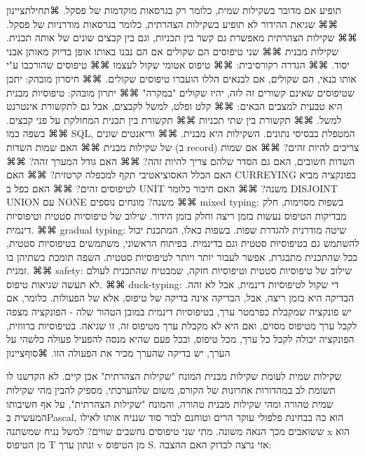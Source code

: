       תופיע אם מדובר בשקילות שמית, כלומר רק בגרסאות מוקדמות של פסקל.
      ⌘תחילת{ציינון}
      ⌘⌘ שגיאת ההידור לא תופיע בשקילות הצהרתית, כלומר בגרסאות מודרניות של פסקל.
      ⌘⌘ שקילות הצהרתית מאפשרת גם קשר בין תכניות, וגם בין קבצים שונים של אותה תכנית.
      שקילות מבנית
      ⌘⌘ שני טיפוסים הם שקולים אם הם נבנו באותו אופן בדיוק מאותן אבני יסוד.
      ⌘⌘ הגדרה רקורסיבית:
      ⌘⌘ טיפוס אטומי שקול לעצמו
      ⌘⌘ טיפוסים שהורכבו ע"י אותו בנאי, הם שקולים, אם לבנאים הללו הועברו טיפוסים שקולים.
      ⌘⌘ חיסרון מובהק: יתכן שטיפוסים שאינם קשורים זה לזה, יהיו שקולים "במקרה"
      ⌘⌘ יתרון מובהק: טיפוסיות מבנית היא טבעית למצבים הבאים:
      ⌘⌘ קלט ופלט, למשל לקבצים, אבל גם לתקשורת אינטרנט למשל.
      ⌘⌘ תקשורת בין שתי תכניות
      ⌘⌘ תקשורת בין תכנית המחולקת על פני קבצים.
      ⌘⌘ בשפה כמו SQL, המטפלת בבסיסי נתונים. השקילות היא מבנית.
      ⌘⌘ וריאנטים שונים של שקילות מבנית
      ⌘⌘ האם שמות השדות (ב record) צריכים להיות זהים?
      ⌘⌘ אם שמות השדות חשובים, האם גם הסדר שלהם צריך להיות זהה?
      ⌘⌘ האם גודל המערך זהה?
      ⌘⌘ האם הכלל האסוציאטיבי תקף למכפלה קרטזית?
      ⌘⌘ האם CURREYING בפונקציה מביא לטיפוסים זהים?
      ⌘⌘ האם כפל ב UNIT משנה?
      ⌘⌘ האם חיבור כלומר DISJOINT UNION עם NONE משנה?
      מונחים נוספים
      ⌘⌘ mixed typing: בשפות מסוימות, חלק מבדיקות הטיפוס נעשות בזמן ריצה וחלק בזמן הידור. שילוב של טיפוסיות סטטית וטיפוסיות דינמית.
      ⌘⌘ gradual typing: שיטה מודרנית להגדרת שפות. בשפות כאלו, המתכנת יכול להשתמש גם בטיפוסיות סטטית וגם בדינמית. בפיתוח הראשוני, משתמשים בטיפוסיות סטטית, ככל שהתכנית מתבגרת, אפשר לעבור יותר ויותר לטיפוסיות סטטית. השפה תומכת בשתיהן בו זמנית.
      ⌘⌘ safety: שילוב של טיפוסיות סטטית וטיפוסיות חזקה, שמבטיח שהתכנית לעולם לא תעשה שגיאות טיפוס.
      ⌘⌘ duck-typing: די שקול לטיפוסיות דינמית, אבל לא זהה. הבדיקה היא בזמן ריצה, אבל, הבדיקה אינה בדיקה של טיפוס, אלא של הפעולות. כלומר, אם יש פונקציה שמקבלת כפרמטר ערך, בטיפוסיות דינמית במובן הטהור שלה - הפונקציה מצפה לקבל ערך מטיפוס מסוים, ואם היא לא מקבלת ערך מטיפוס זה, זו שגיאה. בטיפוסיות ברווזית, הפונקציה יכולה לקבל כל ערך, מכל טיפוס, ובכל פעם שהיא מנסה להפעיל פעולה כלשהי על הערך, יש בדיקה שהערך מכיר את הפעולה הזו.
    ⌘סוף{ציינון}

      שקילות שמית לעומת שקילות מבנית
      המונח "שקילות הצהרתית" אכן קיים. לא הקדשנו לו תשומת לב במהדורות אחרונות של הקורס, משום שלהערכתי, מספיק להבין מהי שקילות שמית טהורה ומהי שקילות מבנית טהורה, והמונח "שקילות הצהרתית", על אף חשיבותו המעשית בְּPascal, הוא כה בבחינת פלפולי עוקר הרים וטוחנם לבור סוד שנניח אותו לאילו ששואבים מכך הנאה משונה.
      מתי שני טיפוסים נחשבים שווים? למשל נניח שמשתנה x הוא מן הטיפוס T ונתון ערך v מן הטיפוס S. אזי נרצה לבדוק האם ההצבה:

